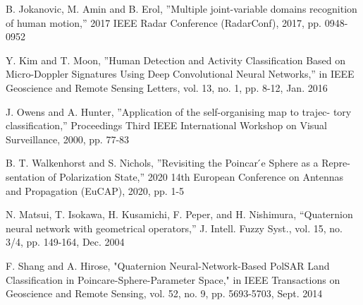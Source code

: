 \documentclass[uplatex,a4paper,12pt]{jsarticle}
\begin{document}
\newpage
\begin{thebibliography}{99}
		
	 B. Jokanovic, M. Amin and B. Erol, ”Multiple joint-variable domains recognition of human motion,” 2017 IEEE Radar Conference (RadarConf), 2017, pp. 0948- 0952
	
     Y. Kim and T. Moon, ”Human Detection and Activity Classification Based on Micro-Doppler Signatures Using Deep Convolutional Neural Networks,” in IEEE Geoscience and Remote Sensing Letters, vol. 13, no. 1, pp. 8-12, Jan. 2016
	
     J. Owens and A. Hunter, ”Application of the self-organising map to trajec- tory classification,” Proceedings Third IEEE International Workshop on Visual Surveillance, 2000, pp. 77-83

     B. T. Walkenhorst and S. Nichols, ”Revisiting the Poincar ́e Sphere as a Repre- sentation of Polarization State,” 2020 14th European Conference on Antennas and Propagation (EuCAP), 2020, pp. 1-5
	
     N. Matsui, T. Isokawa, H. Kusamichi, F. Peper, and H. Nishimura,
    “Quaternion neural network with geometrical operators,” J. Intell. Fuzzy
    Syst., vol. 15, no. 3/4, pp. 149-164, Dec. 2004

     F. Shang and A. Hirose, "Quaternion Neural-Network-Based PolSAR Land Classification in Poincare-Sphere-Parameter Space," in IEEE Transactions on Geoscience and Remote Sensing, vol. 52, no. 9, pp. 5693-5703, Sept. 2014
	    

\end{thebibliography}
\end{document}
